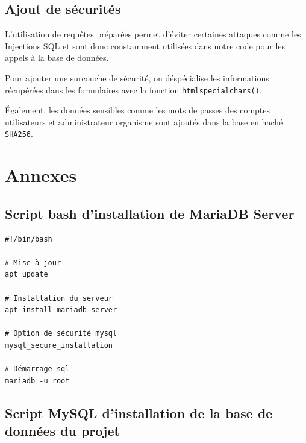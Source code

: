\subsection{Ajout de sécurités}

L'utilisation de requêtes préparées permet d'éviter certaines attaques comme les Injections SQL et sont donc constamment utilisées dans notre code pour les appels à la base de données. 

Pour ajouter une surcouche de sécurité, on déspécialise les informations récupérées dans les formulaires avec la fonction \texttt{htmlspecialchars()}.

Également, les données sensibles comme les mots de passes des comptes utilisateurs et administrateur organisme sont ajoutés dans la base en haché \texttt{SHA256}.
\newpage
\section{Annexes}
\subsection{Script bash d'installation de MariaDB Server}
\begin{verbatim}
#!/bin/bash

# Mise à jour
apt update

# Installation du serveur
apt install mariadb-server  

# Option de sécurité mysql
mysql_secure_installation

# Démarrage sql
mariadb -u root
\end{verbatim}

\subsection{Script MySQL d'installation de la base de données du projet}


